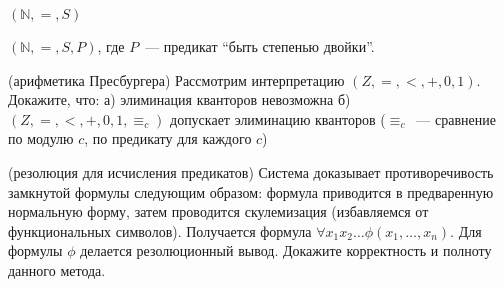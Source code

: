 \begin{ptask}{19}
    $(\mathbb{N}, =, S)$
\end{ptask}

\begin{ptask}{20}
    $(\mathbb{N}, =, S, P)$, где $P$~--- предикат ``быть степенью двойки''.
\end{ptask}

\begin{ptask}{21}(арифметика Пресбургера)
    Рассмотрим интерпретацию $(Z, =, <, +, 0, 1)$.
    Докажите, что:
    а) элиминация кванторов невозможна
    б) $(Z, =, <, +, 0, 1, \equiv_c)$ допускает элиминацию кванторов
    ($\equiv_c$~--- сравнение по модулю $c$, по предикату для каждого $c$)
\end{ptask}

\begin{ptask}{22}(резолюция для исчисления предикатов)
    Система доказывает противоречивость замкнутой формулы следующим
    образом: формула приводится в предваренную нормальную форму, затем
    проводится скулемизация (избавляемся от функциональных
    символов). Получается формула $\forall x_1 x_2 \dots
    \phi(x_1, \dots, x_n)$. Для формулы $\phi$ делается резолюционный
    вывод. Докажите корректность и полноту данного метода.
\end{ptask}